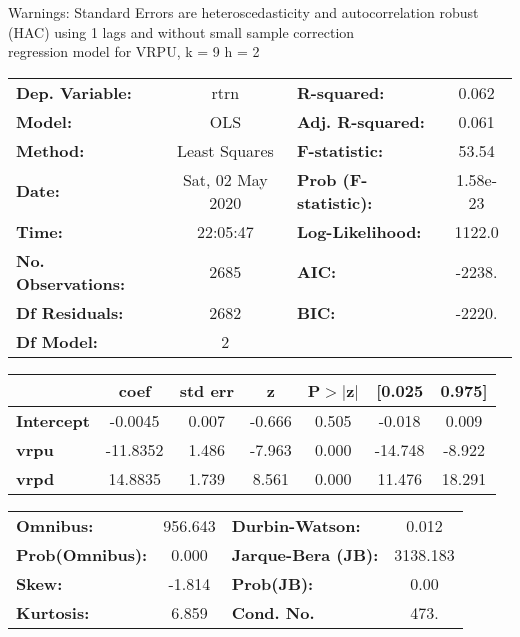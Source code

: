 Warnings: \newline
 [1] Standard Errors are heteroscedasticity and autocorrelation robust (HAC) using 1 lags and without small sample correction\\ 

regression model for VRPU, k = 9 h = 2\begin{center}
\begin{tabular}{lclc}
\toprule
\textbf{Dep. Variable:}    &       rtrn       & \textbf{  R-squared:         } &     0.062   \\
\textbf{Model:}            &       OLS        & \textbf{  Adj. R-squared:    } &     0.061   \\
\textbf{Method:}           &  Least Squares   & \textbf{  F-statistic:       } &     53.54   \\
\textbf{Date:}             & Sat, 02 May 2020 & \textbf{  Prob (F-statistic):} &  1.58e-23   \\
\textbf{Time:}             &     22:05:47     & \textbf{  Log-Likelihood:    } &    1122.0   \\
\textbf{No. Observations:} &        2685      & \textbf{  AIC:               } &    -2238.   \\
\textbf{Df Residuals:}     &        2682      & \textbf{  BIC:               } &    -2220.   \\
\textbf{Df Model:}         &           2      & \textbf{                     } &             \\
\bottomrule
\end{tabular}
\begin{tabular}{lcccccc}
                   & \textbf{coef} & \textbf{std err} & \textbf{z} & \textbf{P$> |$z$|$} & \textbf{[0.025} & \textbf{0.975]}  \\
\midrule
\textbf{Intercept} &      -0.0045  &        0.007     &    -0.666  &         0.505        &       -0.018    &        0.009     \\
\textbf{vrpu}      &     -11.8352  &        1.486     &    -7.963  &         0.000        &      -14.748    &       -8.922     \\
\textbf{vrpd}      &      14.8835  &        1.739     &     8.561  &         0.000        &       11.476    &       18.291     \\
\bottomrule
\end{tabular}
\begin{tabular}{lclc}
\textbf{Omnibus:}       & 956.643 & \textbf{  Durbin-Watson:     } &    0.012  \\
\textbf{Prob(Omnibus):} &   0.000 & \textbf{  Jarque-Bera (JB):  } & 3138.183  \\
\textbf{Skew:}          &  -1.814 & \textbf{  Prob(JB):          } &     0.00  \\
\textbf{Kurtosis:}      &   6.859 & \textbf{  Cond. No.          } &     473.  \\
\bottomrule
\end{tabular}
\end{center}

